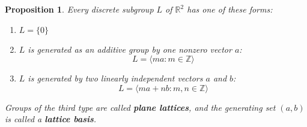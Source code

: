 \documentclass[12pt]{article}
\newtheorem{prop}[thm]{Proposition}
\theoremstyle{definition}
\theoremstyle{remark}
\numberwithin{equation}{section}
\newcommand\R{\mathbb R}    %
\newcommand\Z{\mathbb Z}    %
\newcommand\B[1]{\textbf{ #1}}
\begin{document}
\vspace{15pt}

\begin{prop}
        Every discrete subgroup $L$ of $\R^2$ has one of these forms:\begin{enumerate}
                \item $L = \{0\}$
                \item $L$ is generated as an additive group by one nonzero vector $a$: \begin{equation}
                                L = \langle ma: m \in \Z \rangle
                \end{equation}
                \item $L$ is generated by two linearly independent vectors $a$ and $b$:\begin{equation}
                                L = \langle ma+nb: m,n \in \Z \rangle
                \end{equation}
        \end{enumerate}
        Groups of the third type are called \B{plane lattices}, and the generating set $(a,b)$ is called a \B{lattice basis}.
\end{prop}
\end{document}
